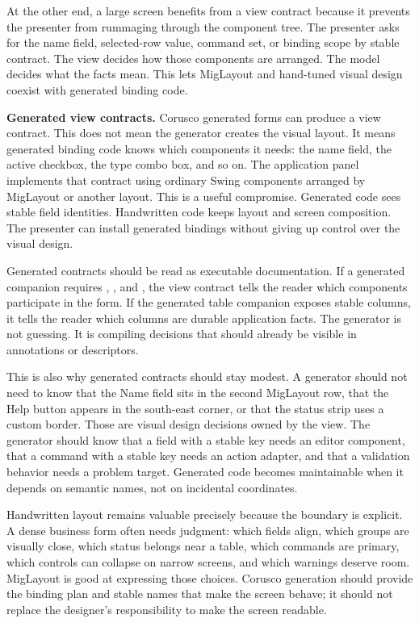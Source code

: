At the other end, a large screen benefits from a view contract because it prevents the presenter from rummaging through the component tree. The presenter asks for the name field, selected-row value, command set, or binding scope by stable contract. The view decides how those components are arranged. The model decides what the facts mean. This lets MigLayout and hand-tuned visual design coexist with generated binding code.

\textbf{Generated view contracts.} Corusco generated forms can produce a view contract. This does not mean the generator creates the visual layout. It means generated binding code knows which components it needs: the name field, the active checkbox, the type combo box, and so on. The application panel implements that contract using ordinary Swing components arranged by MigLayout or another layout. This is a useful compromise. Generated code sees stable field identities. Handwritten code keeps layout and screen composition. The presenter can install generated bindings without giving up control over the visual design.

Generated contracts should be read as executable documentation. If a generated companion requires , , and , the view contract tells the reader which components participate in the form. If the generated table companion exposes stable columns, it tells the reader which columns are durable application facts. The generator is not guessing. It is compiling decisions that should already be visible in annotations or descriptors.

This is also why generated contracts should stay modest. A generator should not need to know that the Name field sits in the second MigLayout row, that the Help button appears in the south-east corner, or that the status strip uses a custom border. Those are visual design decisions owned by the view. The generator should know that a field with a stable key needs an editor component, that a command with a stable key needs an action adapter, and that a validation behavior needs a problem target. Generated code becomes maintainable when it depends on semantic names, not on incidental coordinates.

Handwritten layout remains valuable precisely because the boundary is explicit. A dense business form often needs judgment: which fields align, which groups are visually close, which status belongs near a table, which commands are primary, which controls can collapse on narrow screens, and which warnings deserve room. MigLayout is good at expressing those choices. Corusco generation should provide the binding plan and stable names that make the screen behave; it should not replace the designer's responsibility to make the screen readable.

